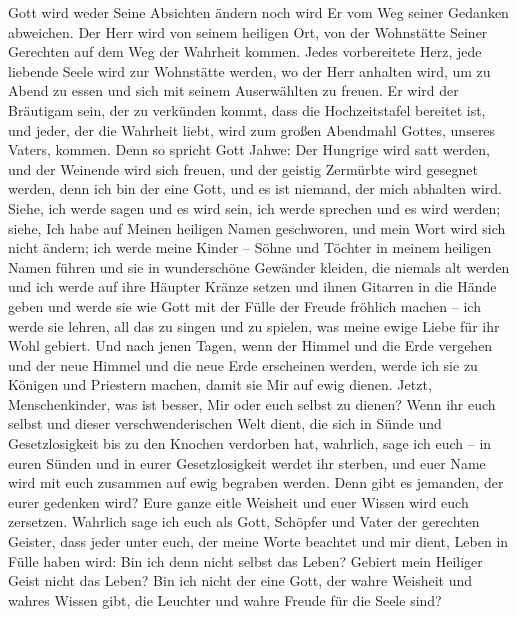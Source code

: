         Gott wird weder Seine Absichten ändern noch wird Er vom Weg seiner Gedanken abweichen. Der Herr wird von seinem heiligen Ort, von der Wohnstätte Seiner Gerechten auf dem Weg der Wahrheit kommen. Jedes vorbereitete Herz, jede liebende Seele wird zur Wohnstätte werden, wo der Herr anhalten wird, um zu Abend zu essen und sich mit seinem Auserwählten zu freuen. Er wird der Bräutigam sein, der zu verkünden kommt, dass die Hochzeitstafel bereitet ist, und jeder, der die Wahrheit liebt, wird zum großen Abendmahl Gottes, unseres Vaters, kommen. Denn so spricht Gott Jahwe: Der Hungrige wird satt werden, und der Weinende wird sich freuen, und der geistig Zermürbte wird gesegnet werden, denn ich bin der eine Gott, und es ist niemand, der mich abhalten wird. Siehe, ich werde sagen und es wird sein, ich werde sprechen und es wird werden; siehe, Ich habe auf Meinen heiligen Namen geschworen, und mein Wort wird sich nicht ändern; ich werde meine Kinder -- Söhne und Töchter in meinem heiligen Namen führen und sie in wunderschöne Gewänder kleiden, die niemals alt werden und ich werde auf ihre Häupter Kränze setzen und ihnen Gitarren in die Hände geben und werde sie wie Gott mit der Fülle der Freude fröhlich machen -- ich werde sie lehren, all das zu singen und zu spielen, was meine ewige Liebe für ihr Wohl gebiert. Und nach jenen Tagen, wenn der Himmel und die Erde vergehen und der neue Himmel und die neue Erde erscheinen werden, werde ich sie zu Königen und Priestern machen, damit sie Mir auf ewig dienen. Jetzt, Menschenkinder, was ist besser, Mir oder euch selbst zu dienen? Wenn ihr euch selbst und dieser verschwenderischen Welt dient, die sich in Sünde und Gesetzlosigkeit bis zu den Knochen verdorben hat, wahrlich, sage ich euch -- in euren Sünden und in eurer Gesetzlosigkeit werdet ihr sterben, und euer Name wird mit euch zusammen auf ewig begraben werden. Denn gibt es jemanden, der eurer gedenken wird? Eure ganze eitle Weisheit und euer Wissen wird euch zersetzen. Wahrlich sage ich euch als Gott, Schöpfer und Vater der gerechten Geister, dass jeder unter euch, der meine Worte beachtet und mir dient, Leben in Fülle haben wird: Bin ich denn nicht selbst das Leben? Gebiert mein Heiliger Geist nicht das Leben? Bin ich nicht der eine Gott, der wahre Weisheit und wahres Wissen gibt, die Leuchter und wahre Freude für die Seele sind? 
        
